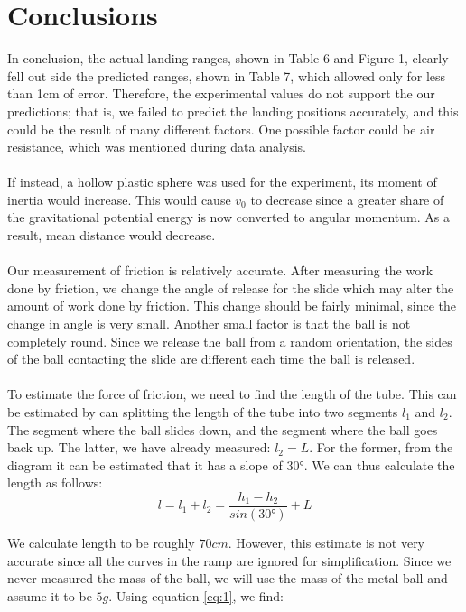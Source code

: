 \documentclass{article}
\begin{document}
\section{Conclusions}
In conclusion, the actual landing ranges, shown in Table 6 and Figure 1, clearly fell out side the predicted ranges, shown in Table 7, which allowed only for less than 1\si{cm} of error. Therefore, the experimental values do not support the our predictions; that is, we failed to predict the landing positions accurately, and this could be the result of many different factors. One possible factor could be air resistance, which was mentioned during data analysis. \\\\
If instead, a hollow plastic sphere was used for the experiment, its moment of inertia would increase. This would cause $v_{0}$ to decrease since a greater share of the gravitational potential energy is now converted to angular momentum. As a result, mean distance would decrease. 
\\\\
Our measurement of friction is relatively accurate. After measuring the work done by friction, we change the angle of release for the slide which may alter the amount of work done by friction. This change should be fairly minimal, since the change in angle is very small. Another small factor is that the ball is not completely round. Since we release the ball from a random orientation, the sides of the ball contacting the slide are different each time the ball is released.
\\\\
To estimate the force of friction, we need to find the length of the tube. This can be estimated by can splitting the length of the tube into two segments $l_{1}$ and $l_{2}$. The segment where the ball slides down, and the segment where the ball goes back up. The latter, we have already measured: $l_{2} = L$. For the former, from the diagram it can be estimated that it has a slope of $\ang{30}$. We can thus calculate the length as follows: 
\begin{equation}
l = l_{1} + l_{2} = \frac{h_{1} - h_{2}}{sin(\ang{30})}+ L
\end{equation}

We calculate length to be roughly $70 \si{cm}$. However, this estimate is not very accurate since all the curves in the ramp are ignored for simplification. Since we never measured the mass of the ball, we will use the mass of the metal ball and assume it to be $5 \si{g}$. Using equation \eqref{eq:1}, we find:
\end{document}
